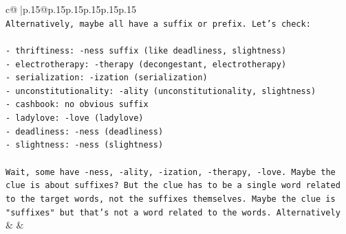 \documentclass{article}
\begin{document}
{\begin{supertabular}{c@{$\;$}|p{.15\linewidth}@{}p{.15\linewidth}p{.15\linewidth}p{.15\linewidth}p{.15\linewidth}p{.15\linewidth}}
{{{\\ 
\texttt{Alternatively, maybe all have a suffix or prefix. Let's check:} \\
\\ 
\texttt{{-} thriftiness: {-}ness suffix (like deadliness, slightness)} \\
\texttt{{-} electrotherapy: {-}therapy (decongestant, electrotherapy)} \\
\texttt{{-} serialization: {-}ization (serialization)} \\
\texttt{{-} unconstitutionality: {-}ality (unconstitutionality, slightness)} \\
\texttt{{-} cashbook: no obvious suffix} \\
\texttt{{-} ladylove: {-}love (ladylove)} \\
\texttt{{-} deadliness: {-}ness (deadliness)} \\
\texttt{{-} slightness: {-}ness (slightness)} \\
\\ 
\texttt{Wait, some have {-}ness, {-}ality, {-}ization, {-}therapy, {-}love. Maybe the clue is about suffixes? But the clue has to be a single word related to the target words, not the suffixes themselves. Maybe the clue is "suffixes" but that's not a word related to the words. Alternatively} \\
            }
        }
    }
    & & \\ \\


\end{supertabular}}
\end{document}
